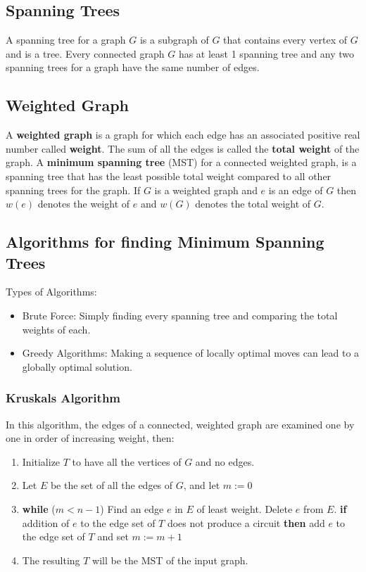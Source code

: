 \documentclass[a4paper]{article}
\begin{document}
  \subsection{Spanning Trees}
  A spanning tree for a graph $G$ is a subgraph of $G$ that contains every vertex of $G$ and is a tree. Every connected graph $G$ has at least 1 spanning tree and any two spanning trees for a graph have the same number of edges.
  \subsection{Weighted Graph}
  A \textbf{weighted graph} is a graph for which each edge has an associated positive real number called \textbf{weight}. The sum of all the edges is called the \textbf{total weight} of the graph. A \textbf{minimum spanning tree} (MST) for a connected weighted graph, is a spanning tree that has the least possible total weight compared to all other spanning trees for the graph. If $G$ is a weighted graph and $e$ is an edge of $G$ then $w(e)$ denotes the weight of $e$ and $w(G)$ denotes the total weight of $G$.
  \subsection{Algorithms for finding Minimum Spanning Trees}
  Types of Algorithms:
  \begin{itemize}
    \item Brute Force: Simply finding every spanning tree and comparing the total weights of each.
    \item Greedy Algorithms: Making a sequence of locally optimal moves can lead  to a globally optimal solution.
  \end{itemize}
  \subsubsection{Kruskal\textquotesingle s Algorithm}
  In this algorithm, the edges of a connected, weighted graph are examined one by one in order of increasing weight, then:
  \begin{enumerate}
    \item Initialize $T$ to have all the vertices of $G$ and no edges.
    \item Let $E$ be the set of all the edges of $G$, and let $m := 0$ 
    \item \textbf{while} ($m < n-1$)
      \subitem Find an edge $e$ in $E$ of least weight.
      \subitem Delete $e$ from $E$.
      \subitem \textbf{if} addition of $e$ to the edge set of $T$ does not produce a circuit 
      \subitem \textbf{then} add $e$ to the edge set of $T$ and set $m:= m+1$
    \item The resulting $T$ will be the MST of the input graph.

  \end{enumerate}
\end{document}
